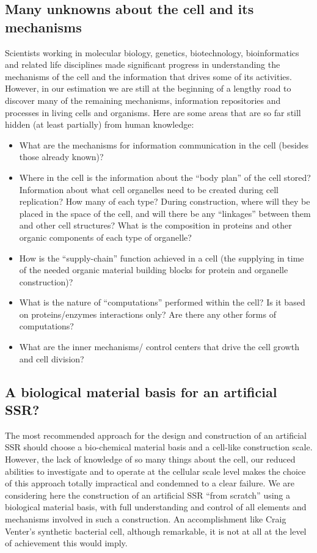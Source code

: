 \subsection{Many unknowns about the cell and its mechanisms}

Scientists working in molecular biology, genetics, biotechnology,
bioinformatics and related life disciplines made significant progress
in understanding the mechanisms of the cell and the information that
drives some of its activities. However, in our estimation we are still
at the beginning of a lengthy road to discover many of the remaining
mechanisms, information repositories and processes in living cells and
organisms. Here are some areas that are so far still hidden (at least
partially) from human knowledge:

\begin{itemize}
\item What are the mechanisms for information communication in the cell
(besides those already known)?
\item Where in the cell is the information about the “body plan” of the
cell stored? Information about what cell organelles need to be created
during cell replication? How many of each type? During construction,
where will they be placed in the space of the cell, and will there be
any “linkages” between them and other cell structures? What is the
composition in proteins and other organic components of each type of
organelle?
\item How is the “supply-chain” function achieved in a cell (the
supplying in time of the needed organic material building blocks for
protein and organelle construction)?
\item What is the nature of “computations” performed within the cell? Is
it based on proteins/enzymes interactions only? Are there any other
forms of computations?
\item What are the inner mechanisms/ control centers that drive the cell
growth and cell division?
\end{itemize}

\subsection{A biological material basis for an artificial SSR?}

The most recommended approach for the design and construction of an
artificial SSR should choose a bio-chemical material basis and a
cell-like construction scale. However, the lack of knowledge of so many
things about the cell, our reduced abilities to investigate and to
operate at the cellular scale level makes the choice of this approach
totally impractical and condemned to a clear failure. We are
considering here the construction of an artificial SSR “from scratch”
using a biological material basis, with full understanding and control
of all elements and mechanisms involved in such a construction. An
accomplishment like Craig Venter’s synthetic bacterial cell, although
remarkable, it is not at all at the level of achievement this would
imply.

